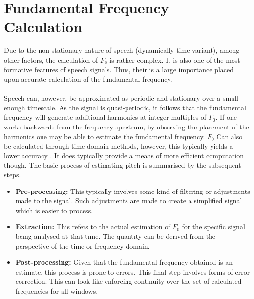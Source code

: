\section{Fundamental Frequency Calculation}
Due to the non-stationary nature of speech (dynamically time-variant), among other factors, the calculation of $F_0$ is rather complex. It is also one of the most formative features of speech signals. Thus, their is a large importance placed upon accurate calculation of the fundamental frequency. 
\\ \\
Speech can, however, be approximated as periodic and stationary over a small enough timescale. As the signal is quasi-periodic, it follows that the fundamental frequency will generate additional harmonics at integer multiples of $F_0$. If one works backwards from the frequency spectrum, by observing the placement of the harmonics one may be able to estimate the fundamental frequency. $F_0$ Can also be calculated through time domain methods, however, this typically yields a lower accuracy \cite{SP_03_textbook}. It does typically provide a means of more efficient computation though. The basic process of estimating pitch is summarised by the subsequent steps.
\begin{itemize}
    \item \textbf{Pre-processing:} This typically involves some kind of filtering or adjustments made to the signal. Such adjustments are made to create a simplified signal which is easier to process.
    
    \item \textbf{Extraction:} This refers to the actual estimation of $F_0$ for the specific signal being analysed at that time. The quantity can be derived from the perspective of the time or frequency domain. 
    
    \item \textbf{Post-processing:} Given that the fundamental frequency obtained is an estimate, this process is prone to errors. This final step involves forms of error correction. This can look like enforcing continuity over the set of calculated frequencies for all windows.
\end{itemize}




